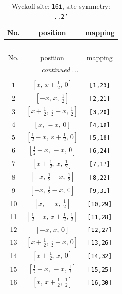 \documentclass[fleqn,8pt]{jsarticle}
\begin{document}
\begin{longtable}{ccc}
\caption{Wyckoff site: {\tt 16i}, site symmetry: {\tt ..2'}}
 \\
 \hline \hline
No. & position & mapping \\ \hline \endfirsthead

\multicolumn{2}{l}{\tablename\ \thetable{}} \\
 \hline \hline
No. & position & mapping \\ \hline \endhead

 \hline \hline
\multicolumn{2}{r}{\footnotesize\it continued ...} \\ \endfoot

 \hline \hline
\multicolumn{2}{r}{} \\ \endlastfoot

1 & $\left[ x,\, x + \frac{1}{2},\, 0 \right]$ & {\tt [1,23]} \\ \hline
2 & $\left[ - x,\, x,\, \frac{1}{2} \right]$ & {\tt [2,21]} \\ \hline
3 & $\left[ x + \frac{1}{2},\, \frac{1}{2} - x,\, \frac{1}{2} \right]$ & {\tt [3,20]} \\ \hline
4 & $\left[ x,\, - x,\, 0 \right]$ & {\tt [4,19]} \\ \hline
5 & $\left[ \frac{1}{2} - x,\, x + \frac{1}{2},\, 0 \right]$ & {\tt [5,18]} \\ \hline
6 & $\left[ \frac{1}{2} - x,\, - x,\, 0 \right]$ & {\tt [6,24]} \\ \hline
7 & $\left[ x + \frac{1}{2},\, x,\, \frac{1}{2} \right]$ & {\tt [7,17]} \\ \hline
8 & $\left[ - x,\, \frac{1}{2} - x,\, \frac{1}{2} \right]$ & {\tt [8,22]} \\ \hline
9 & $\left[ - x,\, \frac{1}{2} - x,\, 0 \right]$ & {\tt [9,31]} \\ \hline
10 & $\left[ x,\, - x,\, \frac{1}{2} \right]$ & {\tt [10,29]} \\ \hline
11 & $\left[ \frac{1}{2} - x,\, x + \frac{1}{2},\, \frac{1}{2} \right]$ & {\tt [11,28]} \\ \hline
12 & $\left[ - x,\, x,\, 0 \right]$ & {\tt [12,27]} \\ \hline
13 & $\left[ x + \frac{1}{2},\, \frac{1}{2} - x,\, 0 \right]$ & {\tt [13,26]} \\ \hline
14 & $\left[ x + \frac{1}{2},\, x,\, 0 \right]$ & {\tt [14,32]} \\ \hline
15 & $\left[ \frac{1}{2} - x,\, - x,\, \frac{1}{2} \right]$ & {\tt [15,25]} \\ \hline
16 & $\left[ x,\, x + \frac{1}{2},\, \frac{1}{2} \right]$ & {\tt [16,30]} \\
\end{longtable}
\end{document}
